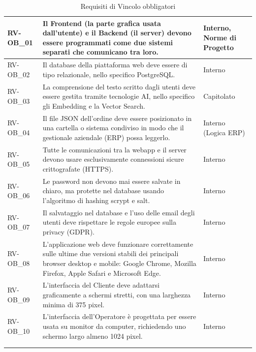 \begin{longtable}{|>{\raggedright}p{}|>{\raggedright\arraybackslash}p{}|>{\raggedright\arraybackslash}p{}|}
    \hline
    RV-OB\_01 \hypertarget{rv-ob_1} & Il Frontend (la parte grafica usata dall'utente) e il Backend (il server) devono essere programmati come due sistemi separati che comunicano tra loro. & Interno, Norme di Progetto \\
    \hline
    RV-OB\_02 \hypertarget{rv-ob_2} & Il database della piattaforma web deve essere di tipo relazionale, nello specifico PostgreSQL. & Interno \\
    \hline
    RV-OB\_03 \hypertarget{rv-ob_3} & La comprensione del testo scritto dagli utenti deve essere gestita tramite tecnologie AI, nello specifico gli Embedding e la Vector Search. & Capitolato \\
    \hline
    RV-OB\_04 \hypertarget{rv-ob_4} & Il file JSON dell'ordine deve essere posizionato in una cartella o sistema condiviso in modo che il gestionale aziendale (ERP) possa leggerlo. & Interno (Logica ERP) \\
    \hline
    RV-OB\_05 \hypertarget{rv-ob_5} & Tutte le comunicazioni tra la webapp e il server devono usare esclusivamente connessioni sicure crittografate (HTTPS). & Interno \\
    \hline
    RV-OB\_06 \hypertarget{rv-ob_6} & Le password non devono mai essere salvate in chiaro, ma protette nel database usando l'algoritmo di hashing scrypt e salt. & Interno \\
    \hline
    RV-OB\_07 \hypertarget{rv-ob_7} & Il salvataggio nel database e l'uso delle email degli utenti deve rispettare le regole europee sulla privacy (GDPR). & Interno \\
    \hline
    RV-OB\_08 \hypertarget{rv-ob_8} & L'applicazione web deve funzionare correttamente sulle ultime due versioni stabili dei principali browser desktop e mobile: Google Chrome, Mozilla Firefox, Apple Safari e Microsoft Edge. & Interno \\
    \hline
    RV-OB\_09 \hypertarget{rv-ob_9} & L'interfaccia del Cliente deve adattarsi graficamente a schermi stretti, con una larghezza minima di 375 pixel. & Interno \\
    \hline
    RV-OB\_10 \hypertarget{rv-ob_10} & L'interfaccia dell'Operatore è progettata per essere usata su monitor da computer, richiedendo uno schermo largo almeno 1024 pixel. & Interno \\
    \hline
    \multicolumn{3}{c}{} \\
    \caption{Requisiti di Vincolo obbligatori}\hypertarget{tab:vincolo_obbligatori}\\
\end{longtable}